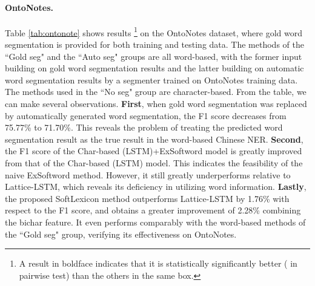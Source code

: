 \documentclass[11pt,a4paper]{article}
\begin{document}
\begin{CJK}{UTF8}{gbsn}
\paragraph{OntoNotes.} Table \ref{tab:ontonote} shows results \footnote{A result in boldface indicates that it is statistically significantly better ( in pairwise test) than the others in the same box.} on the OntoNotes dataset, where gold word segmentation is provided for both training and testing data. 
The methods of the ``Gold seg" and the ``Auto seg" groups are all word-based, with the former input building on gold word segmentation results and the latter building on automatic word segmentation results by a segmenter trained on OntoNotes training data. The methods used in the ``No seg" group are character-based.
From the table, we can make several observations. \textbf{{First}}, when gold word segmentation was replaced by automatically generated word segmentation, the F1 score decreases from 75.77\% to 71.70\%. This reveals the problem of treating the predicted word segmentation result as the true result in the word-based Chinese NER. \textbf{{Second}}, the F1 score of the Char-based (LSTM)+ExSoftword model is greatly improved from that of the Char-based (LSTM) model. This indicates the feasibility of the naive ExSoftword method. However, it still greatly underperforms relative to Lattice-LSTM, which reveals its deficiency in utilizing word information. \textbf{{Lastly}}, the proposed SoftLexicon method outperforms Lattice-LSTM by 1.76\% with respect to the F1 score, and obtains a greater improvement of 2.28\% combining the bichar feature. It even performs comparably with the word-based methods of the ``Gold seg" group, verifying its effectiveness on OntoNotes.




\end{CJK}
\end{document}
